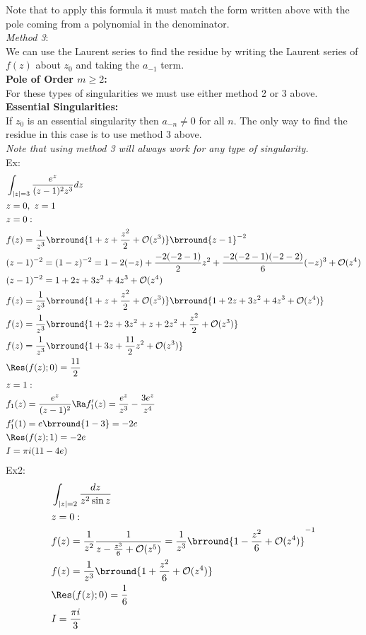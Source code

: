 Note that to apply this formula it must match the form written above with the pole coming from a polynomial in the denominator.\\
\textit{Method 3}:\\
We can use the Laurent series to find the residue by writing the Laurent series of $f(z)$ about $z_0$ and taking the $a_{-1}$ term.\\
\textbf{Pole of Order $m\geq2$:}\\
For these types of singularities we must use either method 2 or 3 above.\\
\textbf{Essential Singularities:}\\
If $z_0$ is an essential singularity then $a_{-n}\neq0$ for all $n$. The only way to find the residue in this case is to use method 3 above.\\
\textit{Note that using method 3 will always work for any type of singularity.}\\
Ex:
\begin{align*}
    &\int_{|z|=3}\frac{e^z}{(z-1)^2z^3}dz\\
    &z=0,\ z=1\\
    &z=0:\\
    &f(z)=\frac{1}{z^3}\brround{1+z+\frac{z^2}{2}+\bigO(z^3)}\brround{z-1}^{-2}\\
    &(z-1)^{-2}=(1-z)^{-2}=1-2(-z)+\frac{-2(-2-1)}{2}z^2+\frac{-2(-2-1)(-2-2)}{6}(-z)^3+\bigO(z^4)\\
    &(z-1)^{-2}=1+2z+3z^2+4z^3+\bigO(z^4)\\
    &f(z)=\frac{1}{z^3}\brround{1+z+\frac{z^2}{2}+\bigO(z^3)}\brround{1+2z+3z^2+4z^3+\bigO(z^4)}\\
    &f(z)=\frac{1}{z^3}\brround{1+2z+3z^2+z+2z^2+\frac{z^2}{2}+\bigO(z^3)}\\
    &f(z)=\frac{1}{z^3}\brround{1+3z+\frac{11}{2}z^2+\bigO(z^3)}\\
    &\Res(f(z);0)=\frac{11}{2}\\
    &z=1:\\
    &f_1(z)=\frac{e^z}{(z-1)^2}\Ra f_1'(z)=\frac{e^z}{z^3}-\frac{3e^z}{z^4}\\
    &f_1'(1)=e\brround{1-3}=-2e\\
    &\Res(f(z);1)=-2e\\
    &I=\pi i(11-4e)
\end{align*}
Ex2:
\begin{align*}
    &\int_{|z|=2}\frac{dz}{z^2\sin z}\\
    &z=0:\\
    &f(z)=\frac{1}{z^2}\frac{1}{z-\frac{z^3}{6}+\bigO(z^5)}=\frac{1}{z^3}\brround{1-\frac{z^2}{6}+\bigO(z^4)}^{-1}\\
    &f(z)=\frac{1}{z^3}\brround{1+\frac{z^2}{6}+\bigO(z^4)}\\
    &\Res(f(z);0)=\frac{1}{6}\\
    &I=\frac{\pi i}{3}
\end{align*}
